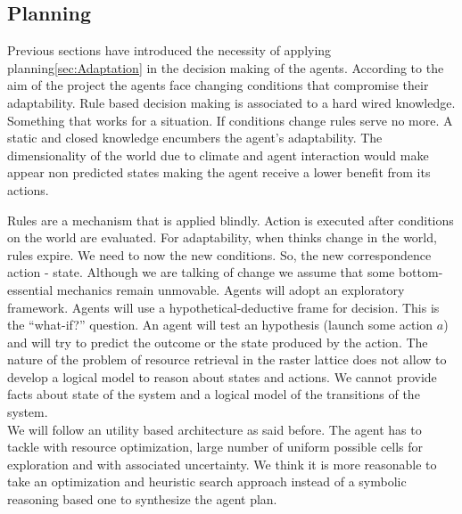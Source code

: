 \documentclass[11pt,oneside,a4paper,openright]{report}
\begin{document}
\subsection{Planning}

Previous sections have introduced the necessity of applying planning\ref{sec:Adaptation} in the decision 
making of the agents. According to the aim of the project the agents face changing conditions that compromise their adaptability. Rule based decision making is associated to a hard wired knowledge. Something that works for a situation.
If conditions change rules serve no more. A static and closed knowledge encumbers the agent's adaptability.
The dimensionality of the world due to climate and agent interaction would make appear non predicted states
making the agent receive a lower benefit from its actions.

Rules are a mechanism that is applied blindly. Action is executed after conditions on the world are evaluated.
For adaptability, when thinks change in the world, rules expire. We need to now the new conditions. So, the 
new correspondence action - state. Although we are talking of change we assume that some bottom-essential mechanics remain unmovable. Agents will adopt an exploratory framework. Agents will use a hypothetical-deductive frame for decision. This is the ``what-if?'' question. An agent will test an hypothesis (launch some action $a$) and will
try to predict the outcome or the state produced by the action. The nature of the problem of resource retrieval in the raster lattice does not allow to develop a logical model to reason about states and actions. We cannot provide facts about state of the system and a logical model of the transitions of the system.\\
We will follow an utility based architecture as said before. The agent has to tackle with resource optimization, large number of uniform possible cells for exploration and with associated uncertainty. We think it is more reasonable to take an optimization and heuristic search approach instead of a symbolic reasoning based one to synthesize the agent plan.
\end{document}
